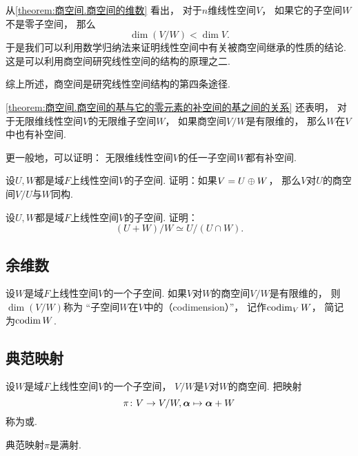 从\cref{theorem:商空间.商空间的维数} 看出，
对于\(n\)维线性空间\(V\)，
如果它的子空间\(W\)不是零子空间，
那么\[
	\dim(V/W) < \dim V.
\]
于是我们可以利用数学归纳法来证明线性空间中有关被商空间继承的性质的结论.
这是可以利用商空间研究线性空间的结构的原理之二.

综上所述，商空间是研究线性空间结构的第四条途径.

\cref{theorem:商空间.商空间的基与它的零元素的补空间的基之间的关系} 还表明，
对于无限维线性空间\(V\)的无限维子空间\(W\)，
如果商空间\(V/W\)是有限维的，
那么\(W\)在\(V\)中也有补空间.

更一般地，可以证明：
无限维线性空间\(V\)的任一子空间\(W\)都有补空间.

\begin{example}
设\(U,W\)都是域\(F\)上线性空间\(V\)的子空间.
证明：如果\(V = U \oplus W\)，
那么\(V\)对\(U\)的商空间\(V/U\)与\(W\)同构.
\end{example}

\begin{example}
设\(U,W\)都是域\(F\)上线性空间\(V\)的子空间.
证明：\[
	(U+W)/W \simeq U/(U \cap W).
\]
\end{example}

\subsection{余维数}
\begin{definition}
设\(W\)是域\(F\)上线性空间\(V\)的一个子空间.
如果\(V\)对\(W\)的商空间\(V/W\)是有限维的，
则\(\dim(V/W)\)称为
“子空间\(W\)在\(V\)中的（codimension）”，
记作\(\operatorname{codim}_V W\)，
简记为\(\operatorname{codim} W\).
\end{definition}

\subsection{典范映射}
\begin{definition}
设\(W\)是域\(F\)上线性空间\(V\)的一个子空间，
\(V/W\)是\(V\)对\(W\)的商空间.
把映射\[
	\pi\colon V \to V/W,
	\boldsymbol\alpha \mapsto \boldsymbol\alpha+W
\]称为或.
\end{definition}
\begin{remark}
典范映射\(\pi\)是满射.
\end{remark}

